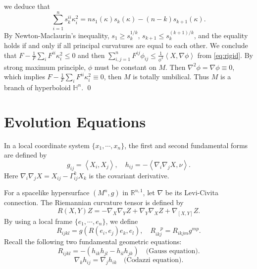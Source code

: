 \documentclass[10pt,a4paper]{amsart}
\newcommand{\R}{\ensuremath{\mathbb{R}}}
\renewcommand{\H}{{\mathbb{H}}}
\newcommand{\ip}[2]{\ensuremath{\left< {#1}, {#2} \right>}}
\numberwithin{equation}{section}
\begin{document}
    we deduce that 
    \[ \sum_{i=1}^{n} s_k^{ii}\kappa_i^2 = ns_1(\kappa)s_k(\kappa) - (n-k)s_{k+1}(\kappa). \]
    By Newton-Maclaurin's inequality, \(s_1 \geq s_k^{1/k}\), \( s_{k+1} \leq s_k^{(k+1)/k} \), and the equality holds if and only if all principal curvatures are equal to each other. We conclude that \(F - \frac{1}{F}\sum_i F^{ii}\kappa_i^2 \leq 0\) and then \(\sum_{i,j=1}^{n} F^{ij}\phi_{ij} \leq \frac{1}{\phi^2}\ip{X}{\nabla \phi}\) from \eqref{eq:rigid}. By strong maximum principle, \(\phi \) must be constant on \(M\). Then \(\nabla^2\phi = \nabla \phi \equiv 0\), which implies \(F - \frac{1}{F}\sum_i F^{ii}\kappa_i^2 \equiv 0\), then \(M\) is totally umbilical. Thus \(M\) is a branch of hyperboloid \(\H^n\). 
\qed %


\section{Evolution Equations}\label{sec:evolution}
In a local coordinate system \(\{x_1,\cdots, x_n\}\), the first and second fundamental forms are defined by 
\[ g_{ij} = \ip{X_i}{X_j}, \quad h_{ij} = -\ip{\nabla_i \nabla_j X}{\nu}. \]
Here \(\nabla_i \nabla_j X = X_{ij} - \Gamma_{ij}^k  X_k\) is the covariant derivative.
\par For a spacelike hypersurface \((M^n,g)\) in \(\R^{n,1}\), let \(\nabla\) be its Levi-Civita connection. The Riemannian curvature tensor is defined by
\begin{equation}\label{eq:Riem-def}
    {R}(X,Y)Z = -\nabla_X\nabla_Y Z + \nabla_Y\nabla_X Z + \nabla_{[X,Y]}Z. 
\end{equation}
By using a local frame $\{e_1,\cdots,e_n\}$, we define 
\begin{equation}
    {R}_{ijkl} = g(R(e_i,e_j)e_k,e_l), \quad {R}_{ikj}^{\quad p} = {R}_{ikjm}g^{mp}.
\end{equation}
Recall the following two fundamental geometric equations: 
\begin{equation}\label{eq:Gauss-eq}
    R_{ijkl} = -(h_{ik}h_{jl} - h_{il}h_{jk}) \quad \text{(Gauss equation)}.
\end{equation}
\begin{equation}\label{eq:Codazzi-eq}
    \nabla_k h_{ij} = \nabla_j h_{ik} \quad \text{(Codazzi equation)}.
\end{equation}
\end{document}
